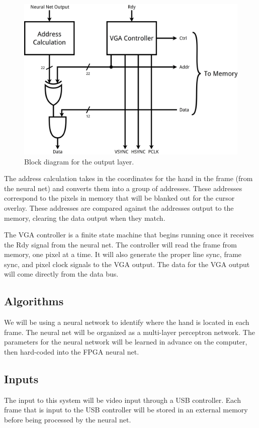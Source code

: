 \documentclass[10pt]{article}
\begin{document}
\begin{figure}[h]
    \centering
    \includegraphics[width=0.6\linewidth]{diagrams/output-layer.png}
    \caption{Block diagram for the output layer.}
\label{fig:output-layer}
\end{figure}

The address calculation takes in the coordinates for the hand in the frame (from
the neural net) and converts them into a group of addresses. These addresses
correspond to the pixels in memory that will be blanked out for the cursor
overlay. These addresses are compared against the addresses output to the
memory, clearing the data output when they match.

The VGA controller is a finite state machine that begins running once it
receives the Rdy signal from the neural net. The controller will read the frame
from memory, one pixel at a time. It will also generate the proper line sync,
frame sync, and pixel clock signals to the VGA output. The data for the VGA
output will come directly from the data bus.

\subsection{Algorithms}
\label{sub:algorithms}

We will be using a neural network to identify where the hand is located in each
frame. The neural net will be organized as a multi-layer perceptron network. The
parameters for the neural network will be learned in advance on the computer,
then hard-coded into the FPGA neural net.

\subsection{Inputs}
\label{sub:inputs}

The input to this system will be video input through a USB controller. Each
frame that is input to the USB controller will be stored in an external memory
before being processed by the neural net.
\end{document}
